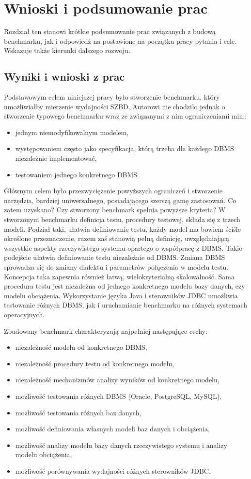 \chapter{Wnioski i podsumowanie prac}
Rozdział ten stanowi krótkie podsumowanie prac związanych z budową benchmarku,
jak i odpowiedź na postawione na początku pracy pytania i cele. Wskazuje także kierunki dalszego rozwoju.

\section{Wyniki i wnioski z prac}
Podstawowym celem niniejszej pracy było stworzenie benchmarku, który umożliwiałby mierzenie
wydajności SZBD. Autorowi nie chodziło jednak o stworzenie typowego benchmarku
wraz ze związanymi z nim ograniczeniami min.:
\begin{itemize}
\item jednym niemodyfikowalnym modelem,
\item występowaniem często jako specyfikacja, którą trzeba dla każdego DBMS niezależnie implementować,
\item testowaniem jednego konkretnego DBMS.
\end{itemize}
Głównym celem było przezwyciężenie powyższych ograniczeń i stworzenie narzędzia,
bardziej uniwersalnego, posiadającego szerszą gamę zastosowań.
Co zatem uzyskano? Czy stworzony benchmark spełnia powyższe kryteria?
W stworzonym benchmarku definicja testu, procedury testowej, składa się z trzech modeli.
Podział taki, ułatwia definiowanie testu, każdy model ma bowiem ściśle określone przeznaczenie, 
razem zaś stanowią pełną definicję, uwzględniającą wszystkie aspekty rzeczywistego 
systemu opartego o współpracę z DBMS. Takie podejście ułatwia definiowanie testu niezależnie od DBMS. Zmiana DBMS 
sprowadza się do zmiany dialektu i parametrów połączenia w modelu testu. Koncepcja 
taka zapewnia również łatwą, wielokryterialną skalowalność. Sama procedura testu jest niezależna 
od jednego konkretnego modelu bazy danych, czy modelu obciążenia. Wykorzystanie 
języka Java i sterowników JDBC umożliwia testowanie różnych DBMS, jak i uruchamianie
benchmarku na różnych systemach operacyjnych.

Zbudowany benchmark charakteryzują najpełniej następujące cechy:
\begin{itemize}
\item niezależność modelu od konkretnego DBMS,
\item niezależność procedury testu od konkretnego modelu,
\item niezależność mechanizmów analizy wyników od konkretnego modelu,
\item możliwość testowania różnych DBMS (Oracle, PostgreSQL, MySQL),
\item możliwość testowania różnych baz danych,
\item możliwość definiowania własnych modeli baz danych i obciążenia,
\item możliwość analizy modelu bazy danych rzeczywistego systemu i analizy modelu obciążenia,
\item możliwość porównywania wydajności różnych sterowników JDBC.
\end{itemize}

